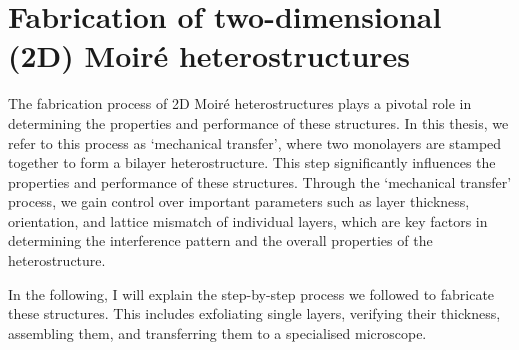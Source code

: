 \chapter{Fabrication of two-dimensional (2D) Moiré heterostructures}
\label{sec:methods}
%


The fabrication process of 2D Moir\'e heterostructures plays a pivotal role in determining the properties and performance of these structures. In this thesis, we refer to this process as `mechanical transfer', where two monolayers are stamped together to form a bilayer heterostructure. This step significantly influences the properties and performance of these structures. 
%
Through the `mechanical transfer' process, we gain control over important parameters such as layer thickness, orientation, and lattice mismatch of individual layers, which are key factors in determining the interference pattern and the overall properties of the heterostructure.

In the following, I will explain the step-by-step process we followed to fabricate these structures. This includes exfoliating single layers, verifying their thickness, assembling them, and transferring them to a specialised microscope.


